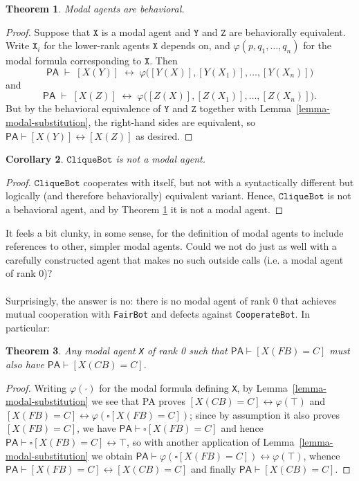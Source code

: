 \documentclass[12pt, letterpaper]{article}
\newtheorem{theorem}{Theorem}[section]
\newtheorem{corollary}[theorem]{Corollary}
\numberwithin{equation}{section}
\begin{document}
\begin{theorem}
\label{behavioral}
Modal agents are behavioral.
\end{theorem}

\begin{proof}
Suppose that $\texttt X$ is a modal agent and $\texttt Y$ and $\texttt Z$ are behaviorally equivalent. Write $\texttt X_i$ for the lower-rank agents $\texttt X$ depends on, and $\varphi(p,q_1,\dotsc,q_n)$ for the modal formula corresponding to $\texttt X$. Then
\[
\mathsf{PA}\;\vdash\;[X(Y)]\;\leftrightarrow\;\varphi\big([Y(X)],[Y(X_1)],\dotsc,[Y(X_n)]\big)
\]
and
\[
\mathsf{PA}\;\vdash\;[X(Z)]\;\leftrightarrow\;\varphi\big([Z(X)],[Z(X_1)],\dotsc,[Z(X_n)]\big).
\]
But by the behavioral equivalence of $\texttt Y$ and $\texttt Z$ together with Lemma~\ref{lemma-modal-substitution}, the right-hand sides are equivalent, so $\mathsf{PA}\vdash[X(Y)]\leftrightarrow[X(Z)]$ as desired.
\end{proof}

\begin{corollary}
$\texttt{CliqueBot}$ is not a modal agent.
\end{corollary}

\begin{proof}
$\texttt{CliqueBot}$ cooperates with itself, but not with a syntactically different but logically (and therefore behaviorally) equivalent variant. Hence, $\texttt{CliqueBot}$ is not a behavioral agent, and by Theorem \ref{behavioral} it is not a modal agent.
\end{proof}

It feels a bit clunky, in some sense, for the definition of modal agents to include references to other, simpler modal agents. Could we not do just as well with a carefully constructed agent that makes no such outside calls (i.e. a modal agent of rank 0)?
\\
\\ Surprisingly, the answer is no: there is no modal agent of rank 0 that achieves mutual cooperation with \texttt{FairBot} and defects against \texttt{CooperateBot}. In particular:
\begin{theorem}
\label{thirdparties}
Any modal agent \texttt{X} of rank 0 such that $\mathsf{PA}\vdash[X(FB)=C]$ must also have $\mathsf{PA}\vdash[X(CB)=C]$.
\end{theorem}

\begin{proof}
Writing $\varphi(\cdot)$ for the modal formula defining \texttt{X}, by Lemma~\ref{lemma-modal-substitution} we see that \textsf{PA} proves $[X(CB) = C]\leftrightarrow\varphi(\top)$ and $[X(FB) = C]\leftrightarrow\varphi(\square[X(FB) = C])$; since by assumption it also proves $[X(FB) = C]$, we have $\mathsf{PA}\vdash\square[X(FB) = C]$ and hence $\mathsf{PA}\vdash\square[X(FB) = C]\leftrightarrow\top$, so with another application of Lemma~\ref{lemma-modal-substitution} we obtain $\mathsf{PA}\vdash\varphi(\square[X(FB) = C])\leftrightarrow\varphi(\top)$, whence $\mathsf{PA}\vdash[X(FB) = C]\leftrightarrow[X(CB) = C]$ and finally $\mathsf{PA}\vdash[X(CB) = C]$.
\end{proof}
\end{document}
